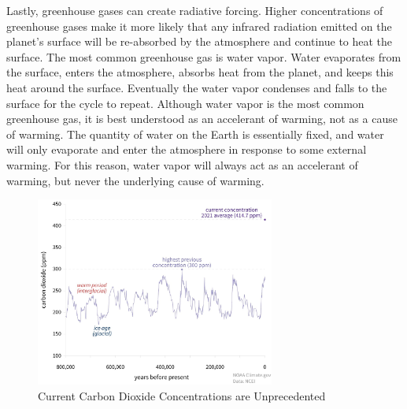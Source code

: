 Lastly, greenhouse gases can create radiative forcing. Higher concentrations of greenhouse gases make it more likely that any infrared radiation emitted on the planet's surface will be re-absorbed by the atmosphere and continue to heat the surface. The most common greenhouse gas is water vapor. Water evaporates from the surface, enters the atmosphere, absorbs heat from the planet, and keeps this heat around the surface. Eventually the water vapor condenses and falls to the surface for the cycle to repeat. Although water vapor is the most common greenhouse gas, it is best understood as an accelerant of warming, not as a cause of warming. The quantity of water on the Earth is essentially fixed, and water will only evaporate and enter the atmosphere in response to some external warming. For this reason, water vapor will always act as an accelerant of warming, but never the underlying cause of warming.

\begin{figure}
	\caption{Current Carbon Dioxide Concentrations are Unprecedented \label{noaa1}}
	\centering
	\includegraphics[width=0.7\textwidth]{figures/chapter1_figures/co2_noaa.jpg}
	\vspace{1em}
\end{figure}

